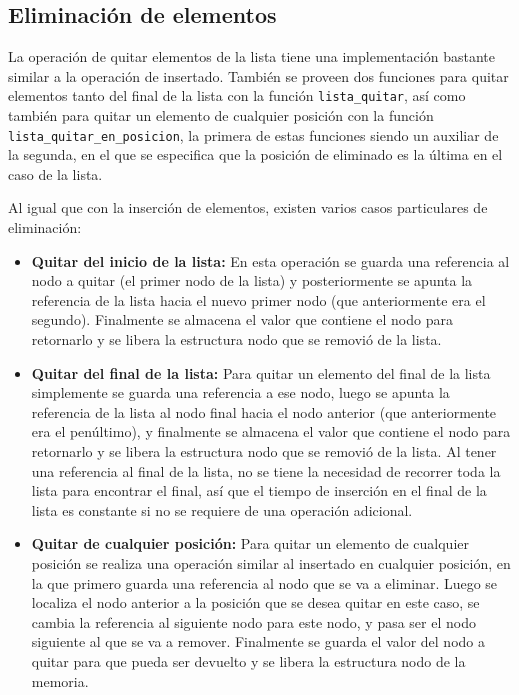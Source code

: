 \documentclass[titlepage,a4paper]{article}
\begin{document}
\subsection{Eliminación de elementos}

La operación de quitar elementos de la lista tiene una implementación bastante similar a la operación de insertado. También se proveen dos funciones para quitar elementos tanto del final de la lista con la función \lstinline{lista_quitar}, así como también para quitar un elemento de cualquier posición con la función \lstinline{lista_quitar_en_posicion}, la primera de estas funciones siendo un auxiliar de la segunda, en el que se especifica que la posición de eliminado es la última en el caso de la lista.

Al igual que con la inserción de elementos, existen varios casos particulares de eliminación:

\begin{itemize}
  \item \textbf{Quitar del inicio de la lista:} En esta operación se guarda una referencia al nodo a quitar (el primer nodo de la lista) y posteriormente se apunta la referencia de la lista hacia el nuevo primer nodo (que anteriormente era el segundo). Finalmente se almacena el valor que contiene el nodo para retornarlo y se libera la estructura nodo que se removió de la lista.
  \item \textbf{Quitar del final de la lista:} Para quitar un elemento del final de la lista simplemente se guarda una referencia a ese nodo, luego se apunta la referencia de la lista al nodo final hacia el nodo anterior (que anteriormente era el penúltimo), y finalmente se almacena el valor que contiene el nodo para retornarlo y se libera la estructura nodo que se removió de la lista. Al tener una referencia al final de la lista, no se tiene la necesidad de recorrer toda la lista para encontrar el final, así que el tiempo de inserción en el final de la lista es constante si no se requiere de una operación adicional.
  \item \textbf{Quitar de cualquier posición:} Para quitar un elemento de cualquier posición se realiza una operación similar al insertado en cualquier posición, en la que primero guarda una referencia al nodo que se va a eliminar. Luego se localiza el nodo anterior a la posición que se desea quitar en este caso, se cambia la referencia al siguiente nodo para este nodo, y pasa ser el nodo siguiente al que se va a remover. Finalmente se guarda el valor del nodo a quitar para que pueda ser devuelto y se libera la estructura nodo de la memoria.
\end{itemize}
\end{document}
